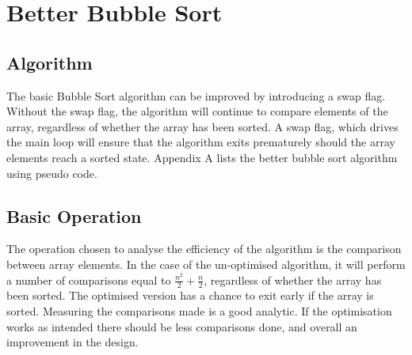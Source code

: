 \documentclass[]{article}
\begin{document}
\newpage

\section{Better Bubble Sort}
\subsection{Algorithm}
The basic Bubble Sort algorithm can be improved by introducing a swap flag. Without the swap flag, the algorithm will continue to compare elements of the array, regardless of whether the array has been sorted. A swap flag, which drives the main loop will ensure that the algorithm exits prematurely should the array elements reach a sorted state. Appendix A lists the better bubble sort algorithm using pseudo code.
\subsection{Basic Operation}
The operation chosen to analyse the efficiency of the algorithm is the comparison between array elements. In the case of the un-optimised algorithm, it will perform a number of comparisons equal to $\frac{n^2}{2} + \frac{n}{2}$, regardless of whether the array has been sorted. The optimised version has a chance to exit early if the array is sorted. Measuring the comparisons made is a good analytic. If the optimisation works as intended there should be less comparisons done, and overall an improvement in the design. 
\end{document}
